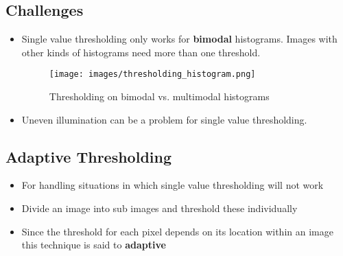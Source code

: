 \subsection*{Challenges}

\begin{itemize}

  \item Single value thresholding only works for \textbf{bimodal}
    histograms. Images with other kinds of histograms need more than
    one threshold.

    \begin{figure}[H]
      \centering
      \texttt{[image: images/thresholding\_histogram.png]}
      \caption{Thresholding on bimodal vs. multimodal histograms}
    \end{figure}

  \item Uneven illumination can be a problem for single value thresholding.
\end{itemize}

\subsection*{Adaptive Thresholding}

\begin{itemize}
  \item For handling situations in which single value thresholding will not work
  \item Divide an image into sub images and threshold these individually
  \item Since the threshold for each pixel depends on its location
    within an image this technique is said to \textbf{adaptive}
\end{itemize}
